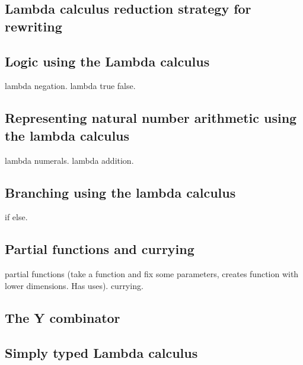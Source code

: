 
\subsection{Lambda calculus reduction strategy for rewriting}

\subsection{Logic using the Lambda calculus}
 
lambda negation.
lambda true false.

\subsection{Representing natural number arithmetic using the lambda calculus}

lambda numerals.
lambda addition.

\subsection{Branching using the lambda calculus}

if else.

\subsection{Partial functions and currying}

partial functions (take a function and fix some parameters, creates function with lower dimensions. Has uses).
currying.

\subsection{The Y combinator}

\subsection{Simply typed Lambda calculus}
 